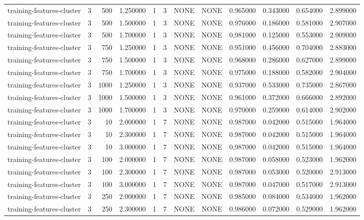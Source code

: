 \begin{tabular}{lrrrllllrrrr}
training-features-cluster & 3 & 500 & 1.250000 & 1 & 3 & NONE & NONE & 0.965000 & 0.343000 & 0.654000 & 2.899000 \\
training-features-cluster & 3 & 500 & 1.500000 & 1 & 3 & NONE & NONE & 0.976000 & 0.186000 & 0.581000 & 2.907000 \\
training-features-cluster & 3 & 500 & 1.700000 & 1 & 3 & NONE & NONE & 0.981000 & 0.125000 & 0.553000 & 2.909000 \\
training-features-cluster & 3 & 750 & 1.250000 & 1 & 3 & NONE & NONE & 0.951000 & 0.456000 & 0.704000 & 2.883000 \\
training-features-cluster & 3 & 750 & 1.500000 & 1 & 3 & NONE & NONE & 0.968000 & 0.286000 & 0.627000 & 2.899000 \\
training-features-cluster & 3 & 750 & 1.700000 & 1 & 3 & NONE & NONE & 0.975000 & 0.188000 & 0.582000 & 2.904000 \\
training-features-cluster & 3 & 1000 & 1.250000 & 1 & 3 & NONE & NONE & 0.937000 & 0.533000 & 0.735000 & 2.867000 \\
training-features-cluster & 3 & 1000 & 1.500000 & 1 & 3 & NONE & NONE & 0.961000 & 0.372000 & 0.666000 & 2.892000 \\
training-features-cluster & 3 & 1000 & 1.700000 & 1 & 3 & NONE & NONE & 0.970000 & 0.259000 & 0.614000 & 2.902000 \\
training-features-cluster & 3 & 10 & 2.000000 & 1 & 7 & NONE & NONE & 0.987000 & 0.042000 & 0.515000 & 1.964000 \\
training-features-cluster & 3 & 10 & 2.300000 & 1 & 7 & NONE & NONE & 0.987000 & 0.042000 & 0.515000 & 1.964000 \\
training-features-cluster & 3 & 10 & 3.000000 & 1 & 7 & NONE & NONE & 0.987000 & 0.042000 & 0.515000 & 1.964000 \\
training-features-cluster & 3 & 100 & 2.000000 & 1 & 7 & NONE & NONE & 0.987000 & 0.058000 & 0.523000 & 1.962000 \\
training-features-cluster & 3 & 100 & 2.300000 & 1 & 7 & NONE & NONE & 0.987000 & 0.053000 & 0.520000 & 2.913000 \\
training-features-cluster & 3 & 100 & 3.000000 & 1 & 7 & NONE & NONE & 0.987000 & 0.047000 & 0.517000 & 2.913000 \\
training-features-cluster & 3 & 250 & 2.000000 & 1 & 7 & NONE & NONE & 0.985000 & 0.084000 & 0.534000 & 1.962000 \\
training-features-cluster & 3 & 250 & 2.300000 & 1 & 7 & NONE & NONE & 0.986000 & 0.072000 & 0.529000 & 1.962000 \\

\end{tabular}
